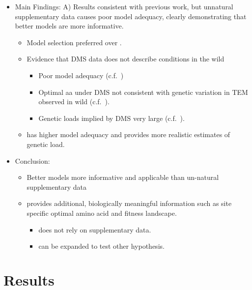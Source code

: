 \documentclass[12pt]{article}
\begin{document}
\begin{itemize}
\begin{itemize}
	\end{itemize}
	\item Main Findings: A) Results consistent with previous work, but unnatural supplementary data causes poor model adequacy, clearly demonstrating that better models are more informative.
	\begin{itemize}
		\item Model selection preferred \selac over \phydms.
		\item Evidence that DMS data does not describe conditions in the wild
		\begin{itemize}
			\item Poor model adequacy (c.f.~\selac)
			\item Optimal aa under DMS not consistent with genetic variation in TEM observed in wild (c.f.~\selac).
			\item Genetic loads implied by DMS very large (c.f.~\selac).
		\end{itemize}
		\item \selac has higher model adequacy and provides more realistic estimates of genetic load.
	\end{itemize}
	\item Conclusion:
        \begin{itemize}
		\item Better models more informative and applicable than un-natural supplementary data
		\item \selac provides additional, biologically meaningful information such as site specific optimal amino acid and fitness landscape.
		\begin{itemize}
			\item \selac does not rely on supplementary data.
			\item \selac can be expanded to test other hypothesis.
		\end{itemize}
        \end{itemize}
\end{itemize}

\section*{Results}
\end{document}
